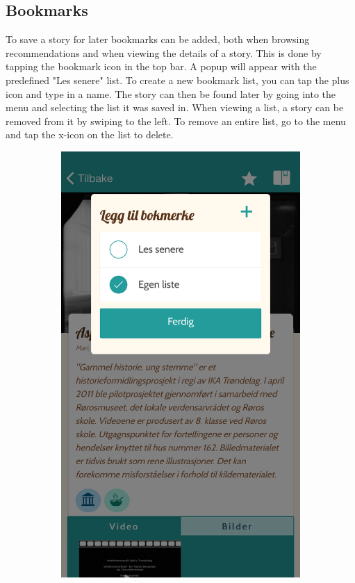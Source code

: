 \begin{appendices}
\clearpage
\section{Bookmarks}
To save a story for later bookmarks can be added, both when browsing recommendations and when viewing the details of a story. This is done by tapping the bookmark icon in the top bar. A popup will appear with the predefined "Les senere" list. To create a new bookmark list, you can tap the plus icon and type in a name. The story can then be found later by going into the menu and selecting the list it was saved in. When viewing a list, a story can be removed from it by swiping to the left. To remove an entire list, go to the menu and tap the x-icon on the list to delete. 

\begin{figure}[h!]
		\centering
		\begin{subfigure}[h]{0.3\textwidth}
			\includegraphics[width=\textwidth]{fig/screenshot_bookmark}

\end{subfigure}
\end{figure}
\end{appendices}
